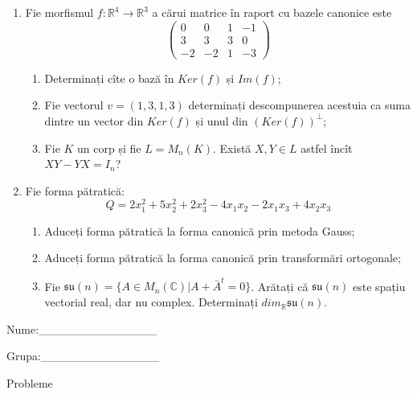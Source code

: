 \documentclass{article}
\begin{document}
\begin{enumerate}
 \item Fie morfismul $f:\mathbb{R}^4 \to \mathbb{R}^3$ a cărui matrice în raport cu bazele canonice este
$$\begin{pmatrix}
0&0&1&-1\\
3&3&3&0\\
-2&-2&1&-3
\end{pmatrix}$$

\begin{enumerate}
\item Determinați cîte o bază în $Ker(f)$ și $Im(f)$;
\item Fie vectorul $v=(1,3,1,3)$ determinați descompunerea acestuia ca suma dintre un vector din $Ker(f)$ și unul din $(Ker(f))^\perp$;
\item Fie $K$ un corp și fie $L=M_n(K)$. Există $X,Y \in L$ astfel încît $XY-YX=I_n$?  
\end{enumerate}
\item Fie forma pătratică:
$$Q= 2x_1^2+5x_2^2+2x_3^2-4x_1x_2-2x_1x_3+4x_2x_3$$

\begin{enumerate}
\item Aduceți forma pătratică la forma canonică prin metoda Gauss;
\item Aduceți forma pătratică la forma canonică prin transformări ortogonale;
\item Fie $\mathfrak{su}(n)=\{ A \in M_n(\mathbb{C}) | A+\bar{A}^t=0\}$. Arătați că $\mathfrak{su}(n)$ este spațiu vectorial real, dar nu complex.
Determinați $dim_{\mathbb{R}}\mathfrak{su}(n)$.
\end{enumerate}
\end{enumerate}
\newpage
\begin{flushright}
Nume:\_\_\_\_\_\_\_\_\_\_\_\_\_\_
 
 
Grupa:\_\_\_\_\_\_\_\_\_\_\_\_\_\_
\end{flushright}
\begin{center}
\vspace{2cm}
{\Large Probleme}
\vspace{2cm}
\end{center}
\end{document}
